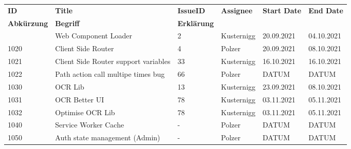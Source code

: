 \sectionauthor{}

\begin{longtable}{|p{}|p{}|p{}|p{}|p{}|p{}|} \hline
    \textbf{ID} & \textbf{Title} & \textbf{Issue\-ID} & \textbf{Assignee} & \textbf{Start Date} & \textbf{End\- Date} \\ \hhline{|=|=|=|=|=|=|}
    \endfirsthead
    \hline
    \textbf{Abkürzung} & \textbf{Begriff} & \textbf{Erklärung} \\ \hhline{|=|=|=|}
    \endhead
    1010 & Web Component Loader & 2 & Kusternigg & 20.09.2021 & 04.10.2021 \\ \hline
    1020 & Client Side Router & 4 & Polzer & 20.09.2021 & 08.10.2021 \\ \hline
    1021 & Client Side Router support variables & 33 & Kusternigg & 16.10.2021 & 16.10.2021 \\ \hline
    1022 & Path action call multipe times bug & 66 & Polzer &  DATUM & DATUM \\ \hline
    1030 & OCR Lib & 13 & Kusternigg & 23.09.2021 & 08.10.2021 \\ \hline
    1031 & OCR Better UI & 78 & Kusternigg & 03.11.2021 & 05.11.2021 \\ \hline
    1032 & Optimise OCR Lib & 78 & Kusternigg & 03.11.2021 & 05.11.2021 \\ \hline
    1040 & Service Worker Cache & - & Polzer & DATUM & DATUM \\ \hline
    1050 & Auth state management (Admin) & - & Polzer & DATUM & DATUM \\ \hline
\end{longtable}



